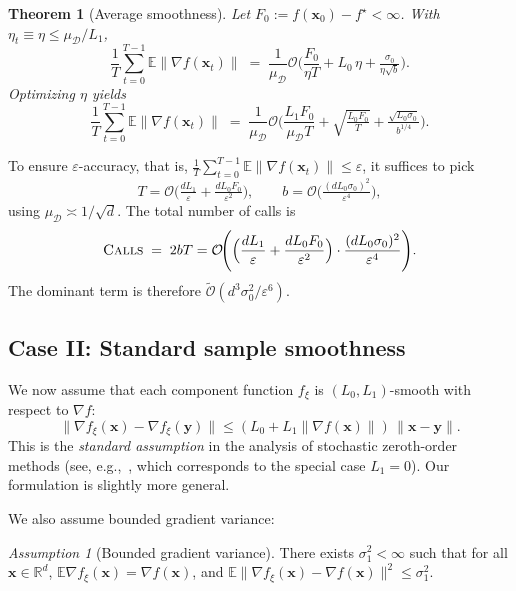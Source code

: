 \documentclass[twoside]{article}
\theoremstyle{plain}
\newtheorem{theorem}[lemma]{Theorem}
\theoremstyle{definition}
\theoremstyle{remark}
\newtheorem{assumption}{Assumption}
\def\cO{{\mathcal{O}}}
\def\vx{{\bm{x}}}
\def\vy{{\bm{y}}}
\def\O{{\mathcal{O}}}
\newcommand{\E}{\mathbb{E}}
\newcommand{\R}{\mathbb{R}}
\begin{document}
\begin{theorem}[Average smoothness]
\label{thm:avg-caseI}
Let $F_0:=f(\vx_0)-f^\star<\infty$. With $\eta_t\equiv \eta \le
\mu_{\mathcal{D}}/L_1$,
\[
    \frac{1}{T}\sum_{t=0}^{T-1}\E\|\nabla f(\vx_t)\|
    \;=\;\frac{1}{\mu_{\mathcal{D}}}
    \cO\!\Big(
        \frac{F_0}{\eta T}
        + L_0\,\eta
        + \tfrac{\sigma_0}{\eta\sqrt{b}}
    \Big).
\]
Optimizing $\eta$ yields
\[
    \frac{1}{T}\sum_{t=0}^{T-1}\E\|\nabla f(\vx_t)\|
    \;=\;\frac{1}{\mu_{\mathcal{D}}}
    \cO\!\Big(
        \frac{L_1 F_0}{\mu_{\mathcal{D}} T}
        + \sqrt{\tfrac{L_0 F_0}{T}}
        + \tfrac{\sqrt{L_0\sigma_0}}{b^{1/4}}
    \Big).
\]
\end{theorem}

To ensure $\varepsilon$-accuracy, that is, $\frac{1}{T}\sum_{t=0}^{T-1}\E\|\nabla f(\vx_t)\| \leq \varepsilon$, it suffices to pick
\[
    T = \O\!\Big(\tfrac{dL_1}{\varepsilon}
            + \tfrac{dL_0F_0}{\varepsilon^2}\Big),
    \qquad
    b = \O\!\Big(\tfrac{(dL_0\sigma_0)^2}{\varepsilon^4}\Big),
\]
using $\mu_{\mathcal{D}}\asymp 1/\sqrt{d}$. The total number of calls is
\[
    \textsc{Calls} \;=\; 2bT
    = \O\!\Bigg(
        \Big(\frac{dL_1}{\varepsilon}
            + \frac{dL_0F_0}{\varepsilon^2}\Big)
        \cdot
        \frac{(dL_0\sigma_0)^2}{\varepsilon^4}
    \Bigg).
\]
The dominant term is therefore
\(\tilde{\cO}(d^3\sigma_0^2/\varepsilon^6)\).

\subsection{Case II: Standard sample smoothness}

We now assume that each component function $f_\xi$ is $(L_0,L_1)$-smooth with
respect to $\nabla f$:
\begin{equation}
\label{eq:sample-smoothness-wrt-f}
    \|\nabla f_\xi(\vx) - \nabla f_\xi(\vy)\|
    \le (L_0+L_1 \|\nabla f(\vx)\|)\,\|\vx-\vy\|.
\end{equation}
This is the \emph{standard assumption} in the analysis of stochastic
zeroth-order methods (see, e.g.,~\cite{ghadimi2013stochastic}, which corresponds
to the special case $L_1=0$). Our formulation is slightly more general.

We also assume bounded gradient variance:
\begin{assumption}[Bounded gradient variance]
\label{ass:grad-var}
There exists $\sigma_1^2<\infty$ such that for all $\vx\in\R^d$, $\E\nabla f_\xi(\vx) = \nabla f(\vx)$, and 
\(
    \E\|\nabla f_\xi(\vx) - \nabla f(\vx)\|^2 \le \sigma_1^2.
\)
\end{assumption}
\end{document}
